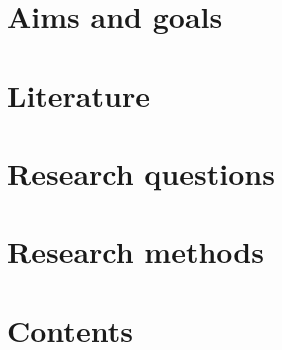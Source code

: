 \documentclass[12pt]{article}
\begin{document}
	\clearpage

	\section{Aims and goals}

	\clearpage

	\section{Literature}

	\clearpage

	\section{Research questions}

	\clearpage

	\section{Research methods}

	\clearpage

	\section{Contents}

	\clearpage


	\nocite{*}

	\printbibliography[heading=bibintoc]
\end{document}
